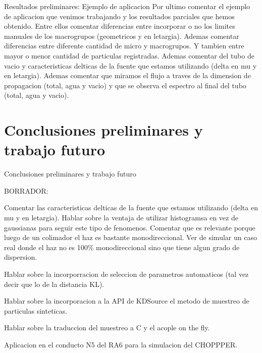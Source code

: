 \documentclass[aspectratio=169,english]{beamer}
\begin{document}
\begin{frame}{Resultados preliminares: Ejemplo de aplicacion}
    Por ultimo comentar el ejemplo de aplicacion que venimos trabajando y los resultados parciales que hemos obtenido. Entre ellos comentar diferencias entre incorporar o no los limites manuales de los macrogrupos (geometricos y en letargia). Ademas comentar diferencias entre diferente cantidad de micro y macrogrupos. Y tambien entre mayor o menor cantidad de particulas registradas.
    Ademas comentar del tubo de vacio y caracteristicas delticas de la fuente que estamos utilizando (delta en mu y en letargia).
    Ademas comentar que miramos el flujo a traves de la dimension de propagacion (total, agua y vacio) y que se observa el espectro al final del tubo (total, agua y vacio).

    

\end{frame}

\section{Conclusiones preliminares y trabajo futuro}

\begin{frame}{Conclusiones preliminares y trabajo futuro}

    BORRADOR:

    Comentar las caracteristicas delticas de la fuente que estamos utilizando (delta en mu y en letargia). Hablar sobre la ventaja de utilizar histogramsa en vez de gaussianas para seguir este tipo de fenomenos. Comentar que es relevante porque luego de un colimador el haz es bastante monodireccional. Ver de simular un caso real donde el haz no es 100\% monodireccional sino que tiene algun grado de dispersion.

    Hablar sobre la incorporracion de seleccion de parametros automaticos (tal vez decir que lo de la distancia KL).
    
    Hablar sobre la incorporacion a la API de KDSource el metodo de muestreo de particulas sinteticas.

    Hablar sobre la traduccion del muestreo a C y el acople on the fly.
    
    Aplicacion en el conducto N5 del RA6 para la simulacion del CHOPPPER.



\end{frame}

\end{document}
